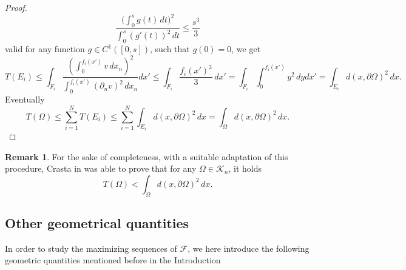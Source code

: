 \documentclass[oneside,a4paper,11pt,notitlepage]{article}
\theoremstyle{definition}
\theoremstyle{plain}
\theoremstyle{definition}
\newtheorem{oss}[esempio]{Remark}
\begin{document}
\begin{proof}
   \begin{equation*}
       \frac{\displaystyle{\bigg(\int_0^sg(t)\,dt\bigg)^2}}{\displaystyle{\int_0^s(g'(t))^2\,dt}}\le \frac{s^3}{3}
   \end{equation*}
   valid for any function $g\in C^1([0,s])$, such that $g(0)=0$, we get
   \begin{equation*}
       T(E_i) \le \int_{F_i}\frac{\displaystyle{\left(\int_0^{f_i(x')} v \, dx_n \right)^2}}{\displaystyle{\int_0^{f_i(x')}(\partial_nv)^2 \, dx_n }}dx'\le \int_{F_i}\frac{f_i(x')^3}{3}\,dx'= \int_{F_i}\int_0^{f_i(x')}y^2\,dydx'= \int_{E_i}d(x,\partial \Omega)^2\,dx .
   \end{equation*}
   Eventually
   \begin{equation*}
       T(\Omega) \le \sum_{i=1}^NT(E_i)\le\sum_{i=1}^N\int_{E_i}d(x,\partial \Omega)^2\,dx  = \int_{\Omega}d(x,\partial \Omega)^2\,dx .
   \end{equation*}
   
\end{proof}

\begin{oss}
\label{crasta<}
    For the sake of completeness, with a suitable adaptation of this procedure, Crasta in \cite{Cra2004} was able to prove that for any $\Omega \in \mathcal K_n$, it holds
\[
T(\Omega) < \int_{\Omega} d(x,\partial\Omega)^2\, dx.
\]
\end{oss}



\subsection{Other geometrical quantities}
In order to study the maximizing sequences of $\mathcal F$, we here introduce the following geometric quantities mentioned before in the Introduction
\end{document}
